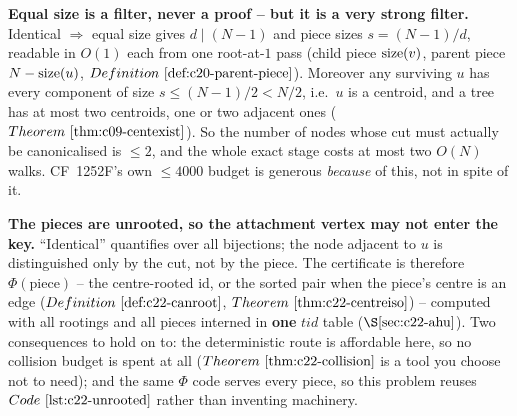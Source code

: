\begin{observation}
\textbf{Equal size is a filter, never a proof -- but it is a very strong filter.}
Identical \(\Rightarrow\) equal size gives \(d\mid(N-1)\) and piece sizes \(s=(N-1)/d\),
readable in \(O(1)\) each from one root-at-\(1\) pass (child piece \(\operatorname{size}(v)\), parent piece
\(N-\operatorname{size}(u)\), \(\defref{c20-parent-piece}\)). Moreover any surviving \(u\) has every
component of size \(s\le(N-1)/2<N/2\), i.e.\ \(u\) is a centroid, and a tree has at most two
centroids, one or two adjacent ones (\(\thmref{c09-centexist}\)). So the number of nodes
whose cut must actually be canonicalised is \(\le2\), and the whole exact stage costs at
most two \(O(N)\) walks. CF~1252F's own \(\le 4000\) budget is generous \emph{because} of
this, not in spite of it.
\end{observation}
\begin{observation}
\textbf{The pieces are unrooted, so the attachment vertex may not enter the key.}
``Identical'' quantifies over all bijections; the node adjacent to \(u\) is distinguished
only by the cut, not by the piece. The certificate is therefore \(\Phi(\text{piece})\) --
the centre-rooted id, or the sorted pair when the piece's centre is an edge
(\(\defref{c22-canroot}\), \(\thmref{c22-centreiso}\)) -- computed with all rootings and all
pieces interned in \textbf{one} \(\mathit{tid}\) table (\(\secref{c22-ahu}\)). Two
consequences to hold on to: the deterministic route is affordable here, so no collision
budget is spent at all (\(\thmref{c22-collision}\) is a tool you choose not to need); and
the same \(\Phi\) code serves every piece, so this problem reuses
\(\coderef{c22-unrooted}\) rather than inventing machinery.
\end{observation}

